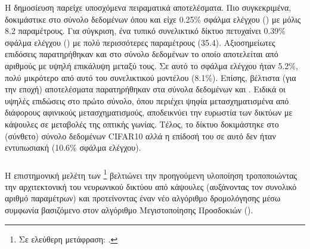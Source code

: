 Η δημοσίευση  παρείχε υποσχόμενα πειραματικά αποτελέσματα. Πιο συγκεκριμένα, δοκιμάστικε στο σύνολο δεδομένων \cite{lecun1998gradientMNIST} όπου και είχε 0.25\% σφάλμα ελέγχου () με μόλις 8.2 παραμέτρους. Για σύγκριση, ένα τυπικό  συνελικτικό δίκτυο πετυχαίνει 0.39\% σφάλμα ελέγχου () με πολύ περισσότερες παραμέτρους (35.4). Αξιοσημείωτες επιδόσεις παρατηρήθηκαν και στο \cite{sabour2017dynamic} σύνολο δεδομένων το οποίο αποτελείται από αριθμούς με υψηλή επικάλυψη μεταξύ τους. Σε αυτό το σφάλμα ελέγχου ήταν 5.2\%, πολύ μικρότερο από αυτό του συνελικτικού μοντέλου (8.1\%). Επίσης, βέλτιστα (για την εποχή) αποτελέσματα παρατηρήθηκαν στα σύνολα δεδομένων  και . Ειδικά οι υψηλές επιδώσεις στο πρώτο σύνολο, όπου περιέχει ψηφία μετασχηματισμένα από διάφορους αφινικούς μετασχηματισμούς, αποδεικνύει την ευρωστία των δικτύων με κάψουλες σε μεταβολές της οπτικής γωνίας. Τέλος, το δίκτυο δοκιμάστηκε στο (σύνθετο) σύνολο δεδομένων CIFAR10 αλλά η επίδοσή του σε αυτό δεν ήταν εντυπωσιακή (10.6\% σφάλμα ελέγχου).

\subsubsection{}

Η επιστημονική μελέτη των \footnote{Σε ελεύθερη μετάφραση: .}\cite{hinton2018matrix} βελτιώνει την προηγούμενη υλοποίηση τροποποιώντας την αρχιτεκτονική του νευρωνικού δικτύου από κάψουλες (αυξάνοντας τον συνολικό αριθμό παραμέτρων) και προτείνοντας έναν νέο αλγόριθμο δρομολόγησης μέσω συμφωνία βασιζόμενο στον αλγόριθμο Μεγιστοποίησης Προσδοκιών (). \par

